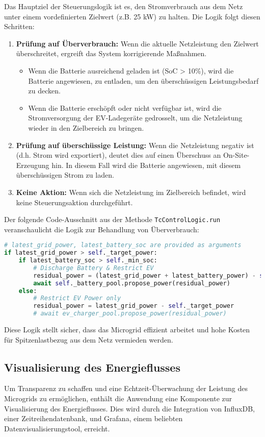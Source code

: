 \documentclass{article}
\begin{document}
Das Hauptziel der Steuerungslogik ist es, den Stromverbrauch aus dem Netz unter einem vordefinierten Zielwert (z.B. 25 kW) zu halten. Die Logik folgt diesen Schritten:
\begin{enumerate}
    \item \textbf{Prüfung auf Überverbrauch:} Wenn die aktuelle Netzleistung den Zielwert überschreitet, ergreift das System korrigierende Maßnahmen.
    \begin{itemize}
        \item Wenn die Batterie ausreichend geladen ist (SoC > 10\%), wird die Batterie angewiesen, zu entladen, um den überschüssigen Leistungsbedarf zu decken.
        \item Wenn die Batterie erschöpft oder nicht verfügbar ist, wird die Stromversorgung der EV-Ladegeräte gedrosselt, um die Netzleistung wieder in den Zielbereich zu bringen.
    \end{itemize}
    \item \textbf{Prüfung auf überschüssige Leistung:} Wenn die Netzleistung negativ ist (d.h. Strom wird exportiert), deutet dies auf einen Überschuss an On-Site-Erzeugung hin. In diesem Fall wird die Batterie angewiesen, mit diesem überschüssigen Strom zu laden.
    \item \textbf{Keine Aktion:} Wenn sich die Netzleistung im Zielbereich befindet, wird keine Steuerungsaktion durchgeführt.
\end{enumerate}

Der folgende Code-Ausschnitt aus der Methode \texttt{TcControlLogic.run} veranschaulicht die Logik zur Behandlung von Überverbrauch:
\begin{lstlisting}[language=Python, caption={Steuerungslogik zur Behandlung von Netzüberlastung.}]
# latest_grid_power, latest_battery_soc are provided as arguments
if latest_grid_power > self._target_power:
    if latest_battery_soc > self._min_soc:
        # Discharge Battery & Restrict EV
        residual_power = (latest_grid_power + latest_battery_power) - self._target_power
        await self._battery_pool.propose_power(residual_power)
    else:
        # Restrict EV Power only
        residual_power = latest_grid_power - self._target_power
        # await ev_charger_pool.propose_power(residual_power)
\end{lstlisting}
Diese Logik stellt sicher, dass das Microgrid effizient arbeitet und hohe Kosten für Spitzenlastbezug aus dem Netz vermieden werden.

\subsection{Visualisierung des Energieflusses}
Um Transparenz zu schaffen und eine Echtzeit-Überwachung der Leistung des Microgrids zu ermöglichen, enthält die Anwendung eine Komponente zur Visualisierung des Energieflusses. Dies wird durch die Integration von InfluxDB, einer Zeitreihendatenbank, und Grafana, einem beliebten Datenvisualisierungstool, erreicht.
\end{document}
